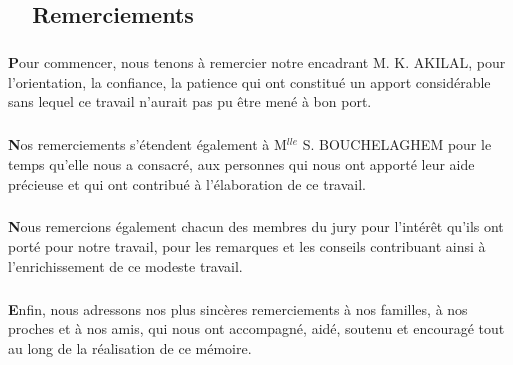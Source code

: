 \begin{titlepage}
\newpage
\pagestyle{fancy}      
\lhead{}  
\chead{}     
\rhead{}     
    
\renewcommand{\headrulewidth}{0.5pt}

\chapter*{\hrulefill ~~\textbf{Remerciements}~ \hrulefill}
\paragraph{}
\paragraph{}
\large

	  \textbf{P}our commencer, nous tenons \`a remercier notre encadrant M. K. AKILAL, pour l'orientation, la confiance, la patience qui ont constitu\'e un apport consid\'erable sans lequel ce travail n'aurait pas pu \^etre men\'e \`a bon port. 
		
		\paragraph{}
			
		\textbf{N}os remerciements s'\'etendent \'egalement \`a M$^{lle}$ S. BOUCHELAGHEM pour le temps qu'elle nous a consacr\'e, aux personnes qui nous ont apport\'e leur aide pr\'ecieuse et qui ont contribu\'e \`a l'\'elaboration de ce travail.
		
		\paragraph{}
		
		\textbf{N}ous remercions \'egalement chacun des membres du jury pour l'int\'er\^et qu'ils ont port\'e pour notre travail, pour les remarques et les conseils contribuant ainsi \`a l'enrichissement de ce modeste travail.
		
		\paragraph{}
		\textbf{E}nfin, nous adressons nos plus sinc\`eres remerciements \`a nos familles, \`a nos proches et \`a nos amis, qui nous ont accompagn\'e, aid\'e, soutenu et encourag\'e tout au long de la r\'ealisation de ce m\'emoire. 
		
		\paragraph{}
		
		
		
		\paragraph{}
		


\thispagestyle{empty}		

\end{titlepage}	